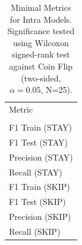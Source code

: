 \begin{table}[ht]
\centering
\begin{tabular}{l}
\hline
Metric &  \\
 &  \\
\hline
F1 Train (STAY) \\
F1 Test (STAY) \\
Precision (STAY) \\
Recall (STAY) \\
F1 Train (SKIP) \\
F1 Test (SKIP) \\
Precision (SKIP) \\
Recall (SKIP) \\
\hline
\end{tabular}
\caption{Minimal Metrics for Intra Models. Significance tested using Wilcoxon signed-rank test against Coin Flip (two-sided, $\alpha=0.05$, N=25).}
\label{tab:metrics_intra}
\end{table}